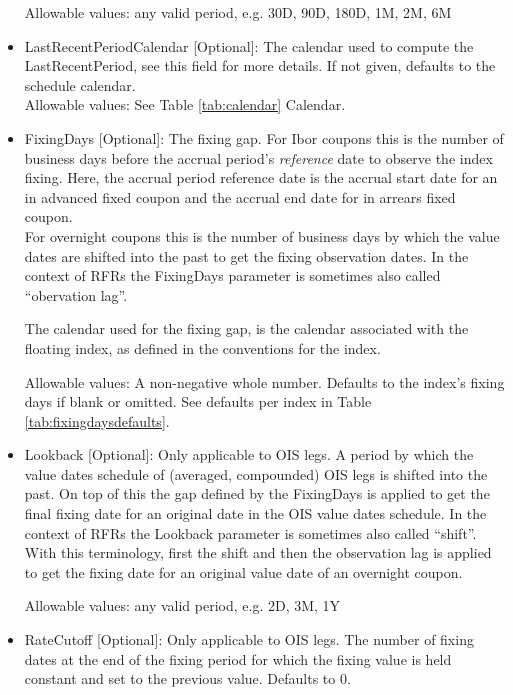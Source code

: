\begin{itemize}
  Allowable values: any valid period, e.g. 30D, 90D, 180D, 1M, 2M, 6M

\item LastRecentPeriodCalendar [Optional]: The calendar used to compute the LastRecentPeriod, see this field for more
  details. If not given, defaults to the schedule calendar. \\

  Allowable values: See Table \ref{tab:calendar} Calendar.

\item FixingDays [Optional]: The fixing gap. For Ibor coupons this is the number of business days before the accrual
  period's {\em reference} date to observe the index fixing. Here, the accrual period reference date is the accrual
  start date for an in advanced fixed coupon and the accrual end date for in arrears fixed coupon. \\
  For overnight coupons this is the number of business days by which the value dates are shifted into the past to get
  the fixing observation dates. In the context of RFRs the FixingDays parameter is sometimes also called
  ``obervation lag''.
  
  The calendar used for the fixing gap, is the calendar associated with the floating index, as defined in the conventions for the index.

  Allowable values: A non-negative whole number.  Defaults to the index's fixing days if blank or omitted. See defaults per index in Table \ref{tab:fixingdaysdefaults}.

\item Lookback [Optional]: Only applicable to OIS legs. A period by which the value dates schedule of (averaged,
  compounded) OIS legs is shifted into the past. On top of this the gap defined by the FixingDays is applied to get the
  final fixing date for an original date in the OIS value dates schedule. In the context of RFRs the Lookback
  parameter is sometimes also called ``shift''. With this terminology, first the shift and then the observation lag is
  applied to get the fixing date for an original value date of an overnight coupon.

  Allowable values: any valid period, e.g. 2D, 3M, 1Y

\item RateCutoff [Optional]: Only applicable to OIS legs. The number of fixing dates at the end of the fixing period for
  which the fixing value is held constant and set to the previous value. Defaults to $0$.


\end{itemize}
